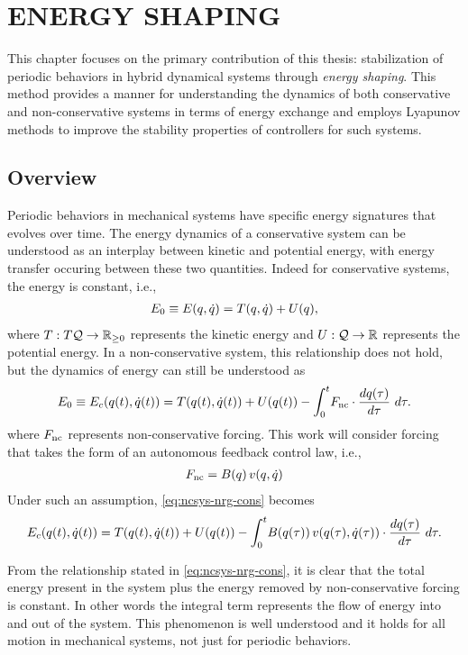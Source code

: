 \chapter{\uppercase{Energy Shaping}} \label{ch:energy-shaping}

This chapter focuses on the primary contribution of this thesis: stabilization
of periodic behaviors in hybrid dynamical systems through {\em energy shaping}.
%
This method provides a manner for understanding the dynamics of both
conservative and  non-conservative systems in terms of energy exchange and
employs Lyapunov methods to improve the stability properties of controllers for
such systems.
%

\section{Overview}

Periodic behaviors in mechanical systems have specific energy signatures that
evolves over time.
%
The energy dynamics of a conservative system can be understood as an interplay
between kinetic and potential energy, with energy transfer occuring between
these two quantities.
%
Indeed for conservative systems, the energy is constant, i.e.,
\begin{align}
  E_{0} \equiv E(q, \dot{q}) = T(q, \dot{q}) + U(q),
\end{align}
where $T : T\mathcal{Q} \to \mathbb{R}_{\geq 0}$ represents the kinetic energy and $U : \mathcal{Q} \to \mathbb{R}$
represents the potential energy.
%
In a non-conservative system, this relationship does not hold, but the dynamics
of energy can still be understood as
\begin{align}
  \label{eq:ncsys-nrg-cons}
  E_{0} \equiv E_{c}(q(t), \dot{q}(t)) = T(q(t), \dot{q}(t)) + U(q(t)) - \int_{0}^{t} \! F_{\mathrm{nc}} \cdot \frac{dq(\tau)}{d\tau} \ d\tau.
\end{align}
where $F_{\mathrm{nc}}$ represents non-conservative forcing.
%
This work will consider forcing that takes the form of an autonomous feedback
control law, i.e.,
\begin{align}
  F_{\mathrm{nc}} = B(q) \, v(q, \dot{q})
\end{align}
%
Under such an assumption, \eqref{eq:ncsys-nrg-cons} becomes
\begin{align}
  E_{c}(q(t), \dot{q}(t)) = T(q(t), \dot{q}(t)) + U(q(t)) - \int_{0}^{t} \!
  B(q(\tau)) \, v(q(\tau), \dot{q}(\tau)) \cdot \frac{dq(\tau)}{d\tau} \ d\tau.
\end{align}

From the relationship stated in \eqref{eq:ncsys-nrg-cons}, it is clear that the
total energy present in the system plus the energy removed by non-conservative
forcing is constant.
%
In other words the integral term represents the flow of energy into and out of
the system.
%
This phenomenon is well understood and it holds for all motion in mechanical
systems, not just for periodic behaviors.

